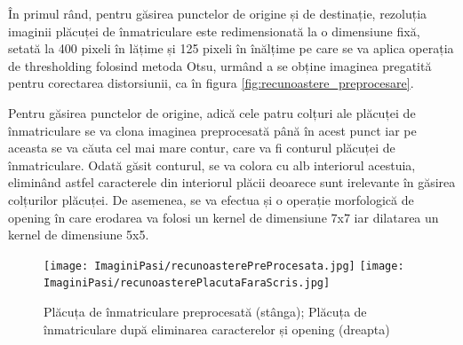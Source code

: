 \documentclass[12pt]{article}
\begin{document}
\^{I}n primul r\^{a}nd, pentru g\u{a}sirea punctelor de origine și de destinație, rezoluția imaginii pl\u{a}cuței de \^{i}nmatriculare este redimensionat\u{a} la o dimensiune fix\u{a}, setat\u{a} la 400 pixeli \^{i}n l\u{a}țime și 125 pixeli \^{i}n \^{i}n\u{a}lțime pe care se va aplica operația de thresholding folosind metoda Otsu, urm\^{a}nd a se obține imaginea pregatit\u{a} pentru corectarea distorsiunii, ca \^{i}n figura \ref{fig:recunoastere_preprocesare}.

Pentru g\u{a}sirea punctelor de origine, adic\u{a} cele patru colțuri ale pl\u{a}cuței de \^{i}nmatriculare se va clona imaginea preprocesat\u{a} p\^{a}n\u{a} \^{i}n acest punct iar pe aceasta se va c\u{a}uta cel mai mare contur, care va fi conturul pl\u{a}cuței de \^{i}nmatriculare. Odat\u{a} g\u{a}sit conturul, se va colora cu alb interiorul acestuia, elimin\^{a}nd astfel caracterele din interiorul pl\u{a}cii deoarece sunt irelevante \^{i}n g\u{a}sirea colțurilor pl\u{a}cuței. De asemenea, se va efectua și o operație morfologic\u{a} de opening \^{i}n care erodarea va folosi un kernel de dimensiune 7x7 iar dilatarea un kernel de dimensiune 5x5.

\begin{figure}[H]
  \centering
  \texttt{[image: ImaginiPasi/recunoasterePreProcesata.jpg]}\hfill
    \texttt{[image: ImaginiPasi/recunoasterePlacutaFaraScris.jpg]}
  \caption{Pl\u{a}cuța de \^{i}nmatriculare preprocesat\u{a} (st\^{a}nga); Pl\u{a}cuța de \^{i}nmatriculare dup\u{a} eliminarea caracterelor și opening (dreapta)}
  \label{fig:recunoastere_clona}
\end{figure}
\end{document}
